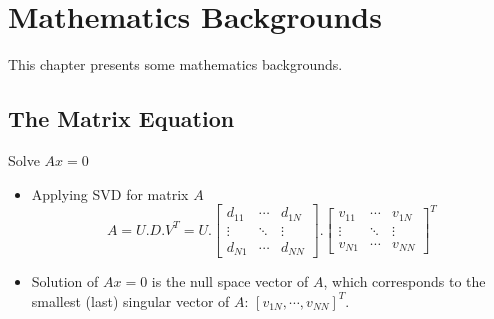 \chapter{Mathematics Backgrounds}
\label{cha:math-cv}
This chapter presents some mathematics backgrounds.

\section{The Matrix Equation}
 Solve $Ax=0$
\begin{itemize}
	\item Applying \ac{SVD} for matrix $A$
	\[ A = U.D.V^T = U. \begin{bmatrix}
		d_{11} & \cdots & d_{1N}\\
		\vdots & \ddots & \vdots\\
		d_{N1} & \cdots & d_{NN}
	\end{bmatrix} . \begin{bmatrix}
		v_{11} & \cdots & v_{1N}\\
		\vdots & \ddots & \vdots\\
		v_{N1} & \cdots & v_{NN}
	\end{bmatrix}^T	\]
	\item Solution of $Ax=0$ is the null space vector of $A$, which corresponds to the smallest (last) singular vector of $A$: $ \left[ v_{1N}, \cdots, v_{NN} \right]^T$.
\end{itemize}